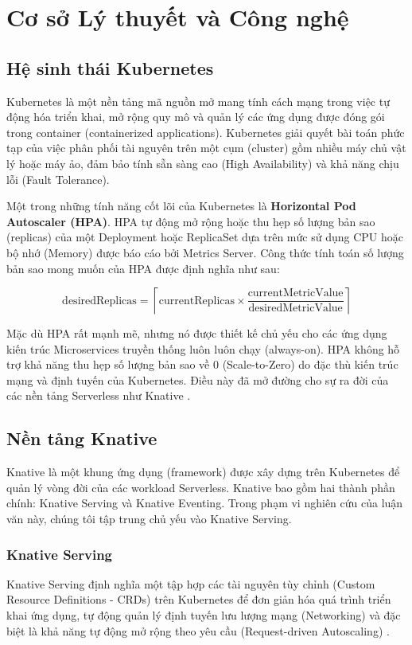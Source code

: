 \section{Cơ sở Lý thuyết và Công nghệ}

\subsection{Hệ sinh thái Kubernetes}
Kubernetes là một nền tảng mã nguồn mở mang tính cách mạng trong việc tự động hóa triển khai, mở rộng quy mô và quản lý các ứng dụng được đóng gói trong container (containerized applications). Kubernetes giải quyết bài toán phức tạp của việc phân phối tài nguyên trên một cụm (cluster) gồm nhiều máy chủ vật lý hoặc máy ảo, đảm bảo tính sẵn sàng cao (High Availability) và khả năng chịu lỗi (Fault Tolerance).

Một trong những tính năng cốt lõi của Kubernetes là \textbf{Horizontal Pod Autoscaler (HPA)}. HPA tự động mở rộng hoặc thu hẹp số lượng bản sao (replicas) của một Deployment hoặc ReplicaSet dựa trên mức sử dụng CPU hoặc bộ nhớ (Memory) được báo cáo bởi Metrics Server. Công thức tính toán số lượng bản sao mong muốn của HPA được định nghĩa như sau:

\begin{equation}
    \text{desiredReplicas} = \left\lceil \text{currentReplicas} \times \frac{\text{currentMetricValue}}{\text{desiredMetricValue}} \right\rceil
\end{equation}

Mặc dù HPA rất mạnh mẽ, nhưng nó được thiết kế chủ yếu cho các ứng dụng kiến trúc Microservices truyền thống luôn luôn chạy (always-on). HPA không hỗ trợ khả năng thu hẹp số lượng bản sao về 0 (Scale-to-Zero) do đặc thù kiến trúc mạng và định tuyến của Kubernetes. Điều này đã mở đường cho sự ra đời của các nền tảng Serverless như Knative \cite{knative2023}.

\subsection{Nền tảng Knative}
Knative là một khung ứng dụng (framework) được xây dựng trên Kubernetes để quản lý vòng đời của các workload Serverless. Knative bao gồm hai thành phần chính: Knative Serving và Knative Eventing. Trong phạm vi nghiên cứu của luận văn này, chúng tôi tập trung chủ yếu vào Knative Serving.

\subsubsection{Knative Serving}
Knative Serving định nghĩa một tập hợp các tài nguyên tùy chỉnh (Custom Resource Definitions - CRDs) trên Kubernetes để đơn giản hóa quá trình triển khai ứng dụng, tự động quản lý định tuyến lưu lượng mạng (Networking) và đặc biệt là khả năng tự động mở rộng theo yêu cầu (Request-driven Autoscaling) \cite{knative2023}. 

